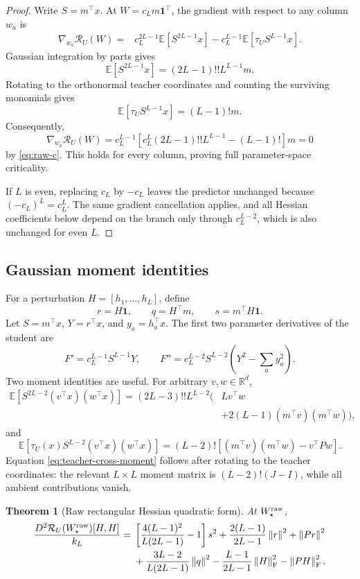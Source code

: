 \documentclass[11pt]{article}
\newtheorem{theorem}{Theorem}[section]
\newcommand{\R}{\mathbb{R}}
\newcommand{\one}{\mathbf{1}}
\newcommand{\norm}[1]{\left\lVert #1\right\rVert}
\newcommand{\F}{\mathrm{F}}
\begin{document}
\begin{proof}
Write $S=m^\top x$.  At $W=c_Lm\one^\top$, the gradient with respect to any column $w_a$ is
\begin{align}
\nabla_{w_a}\mathcal R_U(W)
={}&c_L^{2L-1}\mathbb E[S^{2L-1}x]
-c_L^{L-1}\mathbb E[\tau_U S^{L-1}x].
\label{eq:raw-full-gradient}
\end{align}
Gaussian integration by parts gives
\[
\mathbb E[S^{2L-1}x]=(2L-1)!!L^{L-1}m.
\]
Rotating to the orthonormal teacher coordinates and counting the surviving monomials gives
\[
\mathbb E[\tau_U S^{L-1}x]=(L-1)!m.
\]
Consequently,
\[
\nabla_{w_a}\mathcal R_U(W)
=c_L^{L-1}\left[
 c_L^L(2L-1)!!L^{L-1}-(L-1)!
\right]m=0
\]
by \eqref{eq:raw-c}.  This holds for every column, proving full parameter-space criticality.

If $L$ is even, replacing $c_L$ by $-c_L$ leaves the predictor unchanged because $(-c_L)^L=c_L^L$.  The same gradient cancellation applies, and all Hessian coefficients below depend on the branch only through $c_L^{L-2}$, which is also unchanged for even $L$.
\end{proof}

\subsection{Gaussian moment identities}

For a perturbation $H=[h_1,\ldots,h_L]$, define
\[
r=H\one,\qquad q=H^\top m,\qquad s=m^\top H\one.
\]
Let $S=m^\top x$, $Y=r^\top x$, and $y_a=h_a^\top x$.  The first two parameter derivatives of the student are
\[
F'=c_L^{L-1}S^{L-1}Y,
\qquad
F''=c_L^{L-2}S^{L-2}\left(Y^2-\sum_a y_a^2\right).
\]
Two moment identities are useful.  For arbitrary $v,w\in\R^d$,
\begin{align}
\mathbb E[S^{2L-2}(v^\top x)(w^\top x)]
=(2L-3)!!L^{L-2}\bigl(&L v^\top w\nonumber\\
&+2(L-1)(m^\top v)(m^\top w)\bigr),
\label{eq:student-moment}
\end{align}
and
\begin{equation}
\mathbb E[\tau_U(x)S^{L-2}(v^\top x)(w^\top x)]
=(L-2)!\left[(m^\top v)(m^\top w)-v^\top Pw\right].
\label{eq:teacher-cross-moment}
\end{equation}
Equation \eqref{eq:teacher-cross-moment} follows after rotating to the teacher coordinates: the relevant $L\times L$ moment matrix is $(L-2)!(J-I)$, while all ambient contributions vanish.

\begin{theorem}[Raw rectangular Hessian quadratic form]
\label{thm:raw-quadratic}
At $W_\star^{\rm raw}$,
\begin{align}
\frac{D^2\mathcal R_U(W_\star^{\rm raw})[H,H]}{k_L}
={}&\left[\frac{4(L-1)^2}{L(2L-1)}-1\right]s^2
+\frac{2(L-1)}{2L-1}\norm{r}^2+\norm{Pr}^2\nonumber\\
&+\frac{3L-2}{L(2L-1)}\norm{q}^2
-\frac{L-1}{2L-1}\norm{H}_{\F}^2-\norm{PH}_{\F}^2.
\label{eq:raw-qform}
\end{align}
\end{theorem}
\end{document}
